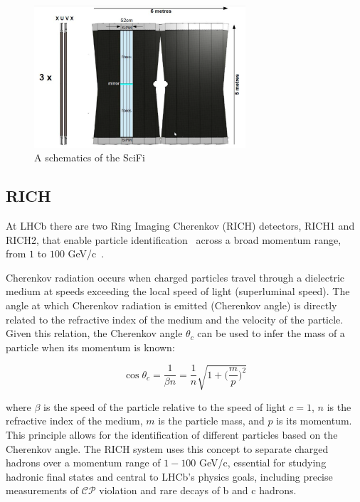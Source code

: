 \begin{figure}
    \centering
    \includegraphics[width=0.7\textwidth]{figures/scifi.png}
    \caption{A schematics of the SciFi}
    \label{fig:scifi}
\end{figure}


\subsection{RICH}
At LHCb there are two Ring Imaging Cherenkov (RICH) detectors, RICH1 and RICH2, that enable particle identification~\cite{LHCb:2013urp} across a broad momentum range, from $1$ to $100$ GeV/c~\cite{Adinolfi_2013}.

Cherenkov radiation occurs when charged particles travel through a dielectric medium at speeds exceeding the local speed of light (superluminal speed). The angle at which Cherenkov radiation is emitted (Cherenkov angle) is directly related to the refractive index of the medium and the velocity of the particle. Given this relation, the Cherenkov angle $\theta_c$ can be used to infer the mass of a particle when its momentum is known:

\begin{equation}
    \cos\theta_c=\frac{1}{\beta n} = \frac{1}{n}\sqrt{1+\biggl(\frac{m}{p}\biggr)^2}
\end{equation}

where $\beta$ is the speed of the particle relative to the speed of light $c=1$, $n$ is the refractive index of the medium, $m$ is the particle mass, and $p$ is its momentum.
This principle allows for the identification of different particles based on the Cherenkov angle. The RICH system uses this concept to separate charged hadrons over a momentum range of $1-100$ GeV/c, essential for studying hadronic final states and central to LHCb's physics goals, including precise measurements of $\mathcal{CP}$ violation and rare decays of b and c hadrons.

